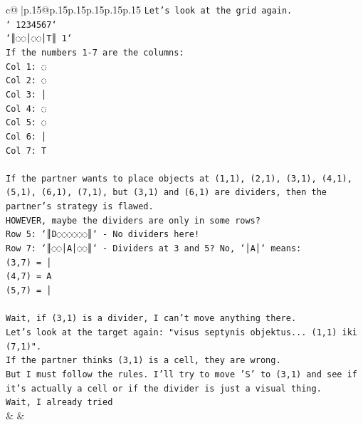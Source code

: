 \documentclass{article}
\begin{document}
{\begin{supertabular}{c@{$\;$}|p{.15\linewidth}@{}p{.15\linewidth}p{.15\linewidth}p{.15\linewidth}p{.15\linewidth}p{.15\linewidth}}
{{{\texttt{Let's look at the grid again.} \\
\texttt{` 1234567`} \\
\texttt{`║◌◌│◌◌│T║ 1`} \\
\texttt{If the numbers 1{-}7 are the columns:} \\
\texttt{Col 1: ◌} \\
\texttt{Col 2: ◌} \\
\texttt{Col 3: │} \\
\texttt{Col 4: ◌} \\
\texttt{Col 5: ◌} \\
\texttt{Col 6: │} \\
\texttt{Col 7: T} \\
\\ 
\texttt{If the partner wants to place objects at (1,1), (2,1), (3,1), (4,1), (5,1), (6,1), (7,1), but (3,1) and (6,1) are dividers, then the partner's strategy is flawed.} \\
\texttt{HOWEVER, maybe the dividers are only in some rows?} \\
\texttt{Row 5: `║D◌◌◌◌◌◌║` {-} No dividers here!} \\
\texttt{Row 7: `║◌◌│A│◌◌║` {-} Dividers at 3 and 5? No, `│A│` means:} \\
\texttt{(3,7) = │} \\
\texttt{(4,7) = A} \\
\texttt{(5,7) = │} \\
\\ 
\texttt{Wait, if (3,1) is a divider, I can't move anything there.} \\
\texttt{Let's look at the target again: "visus septynis objektus... (1,1) iki (7,1)".} \\
\texttt{If the partner thinks (3,1) is a cell, they are wrong.} \\
\texttt{But I must follow the rules. I'll try to move 'S' to (3,1) and see if it's actually a cell or if the divider is just a visual thing.} \\
\texttt{Wait, I already tried} \\
            }
        }
    }
    & & \\ \\


\end{supertabular}}
\end{document}
